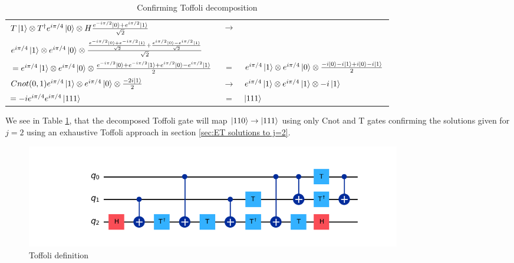 \documentclass[12pt,a4paper]{article}
\begin{document}
\begin{table}[h!]
\begin{tabular}{lcl}
        $T\ket{1}\otimes T^{\dagger}e^{i\pi/4}\ket{0} \otimes H\frac{e^{-i\pi/2}\ket{0} + e^{i\pi/2}\ket{1}}{\sqrt{2}}$    
        &  $ \rightarrow$   &    \\
        $e^{i\pi/4}\ket{1}\otimes e^{i\pi/4}\ket{0} \otimes \frac{\frac{e^{-i\pi/2}\ket{0}+e^{-i\pi/2}\ket{1}}{\sqrt{2}} +\frac{e^{i\pi/2}\ket{0}-e^{i\pi/2}\ket{1}}{\sqrt{2}}} {\sqrt{2}}$  \\ 
        
        $= e^{i\pi/4}\ket{1}\otimes e^{i\pi/4}\ket{0} \otimes \frac{e^{-i\pi/2}\ket{0}+e^{-i\pi/2}\ket{1}+e^{i\pi/2}\ket{0}-e^{i\pi/2}\ket{1} }{2}$    
        &  $=$   &    
        $e^{i\pi/4}\ket{1}\otimes e^{i\pi/4}\ket{0} \otimes \frac{-i\ket{0}-i\ket{1} +i\ket{0}-i\ket{1} }{2}$  \\ 
        
        $Cnot(0,1)e^{i\pi/4}\ket{1}\otimes e^{i\pi/4}\ket{0} \otimes \frac{-2i\ket{1}}{2}$    
        &  $\rightarrow$   &    
        $e^{i\pi/4}\ket{1}\otimes e^{i\pi/4}\ket{1} \otimes -i\ket{1}$  \\

        $= -ie^{i\pi/4}e^{i\pi/4}\ket{111}$    
        & $  =$ &   
        $\ket{111}$  \\
        
    \end{tabular}
    \caption{Confirming Toffoli decomposition}
    \label{tab:toffoli__eval}
\end{table}
We see in Table \ref{tab:toffoli__eval}, that the decomposed Toffoli gate will map \(\ket{110} \rightarrow \ket{111}\) using only Cnot and T gates confirming the solutions given for $j=2$ using an exhaustive Toffoli approach in section \ref{sec:ET solutions to j=2}. 


\begin{figure}[H] 
    \centering \includegraphics[width=0.8\textwidth]{Figures/toffoli_def.png} 
    \caption{Toffoli definition} 
    \label{fig:toffoli_def} 
\end{figure}
\end{document}
